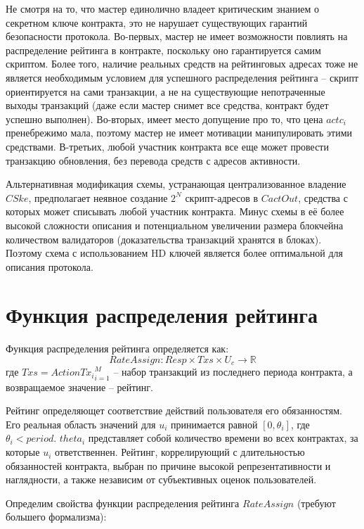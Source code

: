 \documentclass[specification,annotation]{itmo-student-thesis}
\begin{document}
Не смотря на то, что мастер единолично владеет критическим знанием о
секретном ключе контракта, это не нарушает существующих гарантий
безопасности протокола. Во-первых, мастер не имеет возможности
повлиять на распределение рейтинга в контракте, поскольку оно
гарантируется самим скриптом. Более того, наличие реальных средств на
рейтинговых адресах тоже не является необходимым условием для
успешного распределения рейтинга -- скрипт ориентируется на сами
транзакции, а не на существующие непотраченные выходы транзакций (даже
если мастер снимет все средства, контракт будет успешно
выполнен). Во-вторых, имеет место допущение про то, что цена $actc_i$
пренебрежимо мала, поэтому мастер не имеет мотивации манипулировать
этими средствами. В-третьих, любой участник контракта все еще может
провести транзакцию обновления, без перевода средств с адресов
активности.

Альтернативная модификация схемы, устранающая централизованное
владение $CSke$, предполагает неявное создание $2^N$ скрипт-адресов в
$CactOut$, средства с которых может списывать любой участник
контракта. Минус схемы в её более высокой сложности описания и
потенциальном увеличении размера блокчейна количеством валидаторов
(доказательства транзакций хранятся в блоках). Поэтому схема с
использованием HD ключей является более оптимальной для описания
протокола.

\section{Функция распределения рейтинга}

Функция распределения рейтинга определяется как:
\[RateAssign : Resp \times Txs \times U_c \rightarrow \mathbb{R}\]
где $Txs = {ActionTx_i}_{i=1}^M$ -- набор транзакций из последнего
периода контракта, а возвращаемое значение -- рейтинг.

Рейтинг определяющет соответствие действий пользователя его
обязанностям. Его реальная область значений для $u_i$ принимается
равной $[0,\theta_i]$, где $\theta_i < period$. $theta_i$ представляет
собой количество времени во всех контрактах, за которые $u_i$
ответственнен. Рейтинг, коррелирующий с длительностью обязанностей
контракта, выбран по причине высокой репрезентативности и наглядности,
а также независим от субъективных оценок пользователей.

Определим свойства функции распределения рейтинга $RateAssign$
(требуют большего формализма):
\end{document}
